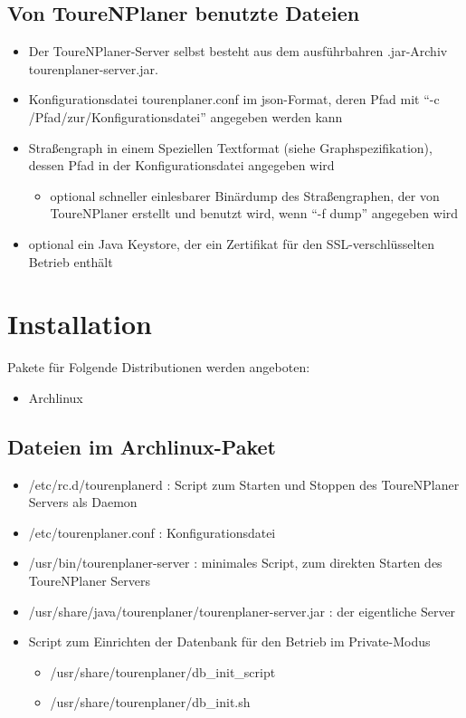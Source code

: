 \documentclass[ngerman,titlepage,parskip=true]{scrartcl}
\begin{document}
  \subsection{Von ToureNPlaner benutzte Dateien}
	 \begin{itemize}
	   \item Der ToureNPlaner-Server selbst besteht aus dem ausf\"uhrbahren .jar-Archiv tourenplaner-server.jar.
	   \item Konfigurationsdatei tourenplaner.conf im json-Format, deren Pfad mit ``-c /Pfad/zur/Konfigurationsdatei'' angegeben werden kann
	   \item Stra\ss{}engraph in einem Speziellen Textformat (siehe Graphspezifikation), dessen Pfad in der Konfigurationsdatei angegeben wird
		\begin{itemize}
		  \item optional schneller einlesbarer Bin\"ardump des Stra\ss{}engraphen, der von ToureNPlaner erstellt und benutzt wird, wenn ``-f dump'' angegeben wird
		\end{itemize}
	   \item optional ein Java Keystore, der ein Zertifikat f\"ur den SSL-verschl\"usselten Betrieb enth\"alt
	 \end{itemize}

\section{Installation}
  Pakete f\"ur Folgende Distributionen werden angeboten:
  \begin{itemize}
    \item Archlinux
  \end{itemize}
  \subsection{Dateien im Archlinux-Paket}
	\begin{itemize}
	  \item /etc/rc.d/tourenplanerd : Script zum Starten und Stoppen des ToureNPlaner Servers als Daemon
	  \item /etc/tourenplaner.conf : Konfigurationsdatei
	  \item /usr/bin/tourenplaner-server : minimales Script, zum direkten Starten des ToureNPlaner Servers
	  \item /usr/share/java/tourenplaner/tourenplaner-server.jar : der eigentliche Server
	  \item Script zum Einrichten der Datenbank f\"ur den Betrieb im Private-Modus
		\begin{itemize}
		  \item /usr/share/tourenplaner/db\_init\_script
		  \item /usr/share/tourenplaner/db\_init.sh
		\end{itemize}
	\end{itemize}
\end{document}
